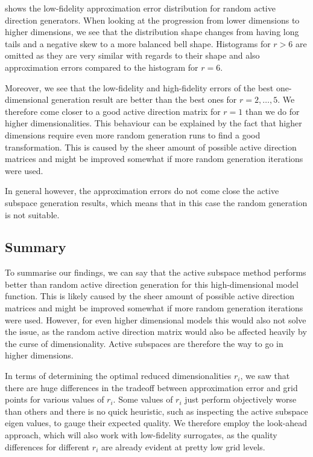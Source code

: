 \documentclass[
  a4paper,  %
  twoside,  %
  bibliography=totoc,
  headsepline,
  cleardoublepage=empty,
  parskip=half,
  draft=false
]{scrbook}
\begin{document}
 shows the low-fidelity approximation error distribution for random active direction generators.
When looking at the progression from lower dimensions to higher dimensions, we see that the distribution shape changes from having long tails and a negative skew to a more balanced bell shape.
Histograms for $r > 6$ are omitted as they are very similar with regards to their shape and also approximation errors compared to the histogram for $r=6$.

Moreover, we see that the low-fidelity and high-fidelity errors of the best one-dimensional generation result are better than the best ones for $r=2, \dots, 5$.
We therefore come closer to a good active direction matrix for $r=1$ than we do for higher dimensionalities.
This behaviour can be explained by the fact that higher dimensions require even more random generation runs to find a good transformation.
This is caused by the sheer amount of possible active direction matrices and might be improved somewhat if more random generation iterations were used.

In general however, the approximation errors do not come close the active subspace generation results, which means that in this case the random generation is not suitable.

\subsection{Summary}

To summarise our findings, we can say that the active subspace method performs better than random active direction generation for this high-dimensional model function.
This is likely caused by the sheer amount of possible active direction matrices and might be improved somewhat if more random generation iterations were used.
However, for even higher dimensional models this would also not solve the issue, as the random active direction matrix would also be affected heavily by the curse of dimensionality.
Active subspaces are therefore the way to go in higher dimensions.

In terms of determining the optimal reduced dimensionalities $r_i$, we saw that there are huge differences in the tradeoff between approximation error and grid points for various values of $r_i$.
Some values of $r_i$ just perform objectively worse than others and there is no quick heuristic, such as inspecting the active subspace eigen values, to gauge their expected quality.
We therefore employ the look-ahead approach, which will also work with low-fidelity surrogates, as the quality differences for different $r_i$ are already evident at pretty low grid levels.
\end{document}
